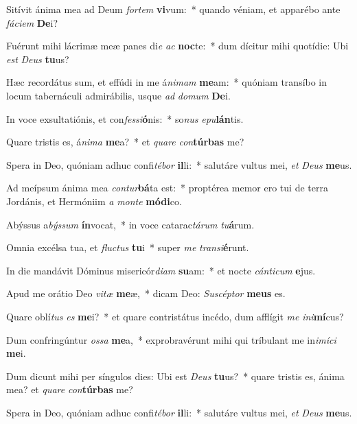 \item Sitívit ánima mea ad Deum \textit{for}\textit{tem} \textbf{vi}vum:~* quando véniam, et apparébo ante \textit{fá}\textit{ci}\textit{em} \textbf{De}i?
\item Fuérunt mihi lácrimæ meæ panes di\textit{e} \textit{ac} \textbf{noc}te:~* dum dícitur mihi quotídie: Ubi \textit{est} \textit{De}\textit{us} \textbf{tu}us?
\item Hæc recordátus sum, et effúdi in me á\textit{ni}\textit{mam} \textbf{me}am:~* quóniam transíbo in locum tabernáculi admirábilis, usque \textit{ad} \textit{do}\textit{mum} \textbf{De}i.
\item In voce exsultatiónis, et con\textit{fes}\textit{si}\textbf{ó}nis:~* so\textit{nus} \textit{e}\textit{pu}\textbf{lán}tis.
\item Quare tristis es, á\textit{ni}\textit{ma} \textbf{me}a?~* et \textit{qua}\textit{re} \textit{con}\textbf{túr}\textbf{bas} me?
\item Spera in Deo, quóniam adhuc confi\textit{té}\textit{bor} \textbf{il}li:~* salutáre vultus mei, \textit{et} \textit{De}\textit{us} \textbf{me}us.
\item Ad meípsum ánima mea \textit{con}\textit{tur}\textbf{bá}ta est:~* proptérea memor ero tui de terra Jordánis, et Hermóniim \textit{a} \textit{mon}\textit{te} \textbf{mó}\textbf{di}co.
\item Abýssus a\textit{býs}\textit{sum} \textbf{ín}vocat,~* in voce catarac\textit{tá}\textit{rum} \textit{tu}\textbf{á}rum.
\item Omnia excélsa tua, et \textit{fluc}\textit{tus} \textbf{tu}i~* super \textit{me} \textit{trans}\textit{i}\textbf{é}runt.
\item In die mandávit Dóminus misericór\textit{di}\textit{am} \textbf{su}am:~* et nocte \textit{cán}\textit{ti}\textit{cum} \textbf{e}jus.
\item Apud me orátio Deo \textit{vi}\textit{tæ} \textbf{me}æ,~* dicam Deo: \textit{Su}\textit{scép}\textit{tor} \textbf{me}\textbf{us} es.
\item Quare oblí\textit{tus} \textit{es} \textbf{me}i?~* et quare contristátus incédo, dum afflígit \textit{me} \textit{in}\textit{i}\textbf{mí}cus?
\item Dum confringúntur \textit{os}\textit{sa} \textbf{me}a,~* exprobravérunt mihi qui tríbulant me in\textit{i}\textit{mí}\textit{ci} \textbf{me}i.
\item Dum dicunt mihi per síngulos dies: Ubi est \textit{De}\textit{us} \textbf{tu}us?~* quare tristis es, ánima mea? et \textit{qua}\textit{re} \textit{con}\textbf{túr}\textbf{bas} me?
\item Spera in Deo, quóniam adhuc confi\textit{té}\textit{bor} \textbf{il}li:~* salutáre vultus mei, \textit{et} \textit{De}\textit{us} \textbf{me}us.
